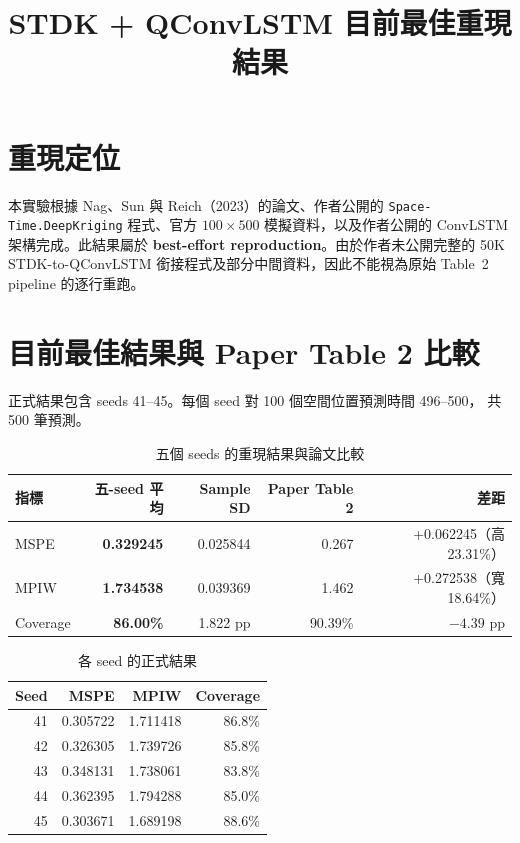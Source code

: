 \documentclass[12pt,a4paper]{article}
\title{STDK + QConvLSTM 目前最佳重現結果}
\author{}
\date{}
\begin{document}
\maketitle

\section{重現定位}

本實驗根據 Nag、Sun 與 Reich（2023）的論文、作者公開的
\texttt{Space-Time.DeepKriging} 程式、官方 $100\times500$ 模擬資料，以及作者公開的
ConvLSTM 架構完成。此結果屬於 \textbf{best-effort reproduction}。由於作者未公開完整的
50K STDK-to-QConvLSTM 銜接程式及部分中間資料，因此不能視為原始 Table~2 pipeline
的逐行重跑。

\section{目前最佳結果與 Paper Table 2 比較}

正式結果包含 seeds 41--45。每個 seed 對 100 個空間位置預測時間 496--500，
共 500 筆預測。

\begin{table}[htbp]
\centering
\caption{五個 seeds 的重現結果與論文比較}
\begin{tabular}{lrrrr}
\toprule
指標 & 五-seed 平均 & Sample SD & Paper Table 2 & 差距 \\
\midrule
MSPE & \textbf{0.329245} & 0.025844 & 0.267 & +0.062245（高 23.31\%） \\
MPIW & \textbf{1.734538} & 0.039369 & 1.462 & +0.272538（寬 18.64\%） \\
Coverage & \textbf{86.00\%} & 1.822 pp & 90.39\% & $-4.39$ pp \\
\bottomrule
\end{tabular}
\end{table}

\begin{table}[htbp]
\centering
\caption{各 seed 的正式結果}
\begin{tabular}{rrrr}
\toprule
Seed & MSPE & MPIW & Coverage \\
\midrule
41 & 0.305722 & 1.711418 & 86.8\% \\
42 & 0.326305 & 1.739726 & 85.8\% \\
43 & 0.348131 & 1.738061 & 83.8\% \\
44 & 0.362395 & 1.794288 & 85.0\% \\
45 & 0.303671 & 1.689198 & 88.6\% \\
\bottomrule
\end{tabular}
\end{table}
\end{document}

